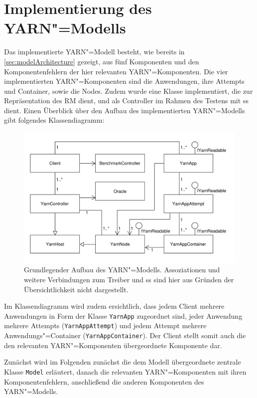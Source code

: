 \section{Implementierung des \acs{YARN}"=Modells}
\label{sec:yarnModel}

Das implementierte \ac{YARN}"=Modell besteht, wie bereits in \cref{sec:modelArchitecture} gezeigt, aus fünf Komponenten und den Komponentenfehlern der hier relevanten \ac{YARN}"=Komponenten.
Die vier implementierten \ac{YARN}"=Komponenten sind die Anwendungen, ihre Attempts und Container, sowie die Nodes.
Zudem wurde eine Klasse implementiert, die zur Repräsentation des \ac{RM} dient, und als Controller im Rahmen des Testens mit \ac{ss} dient.
Einen Überblick über den Aufbau des implementierten \ac{YARN}"=Modells gibt folgendes Klassendiagramm:

\begin{figure}[h]
    \includegraphics{./resources/yarnModel_ls_MA.pdf}
    \caption[Grundlegender Aufbau des \acs{YARN}"=Modells]
        {Grundlegender Aufbau des \acs{YARN}"=Modells.
        Assoziationen und weitere Verbindungen zum Treiber und \acs{ss} sind hier aus Gründen der Übersichtlichkeit nicht dargestellt.}
    \label{fig:yarnModelClassDiagram}
\end{figure}

Im Klassendiagramm wird zudem ersichtlich, dass jedem Client mehrere Anwendungen in Form der Klasse \texttt{YarnApp} zugeordnet sind, jeder Anwendung mehrere Attempts (\texttt{YarnAppAttempt}) und jedem Attempt mehrere Anwendungs"=Container (\texttt{YarnAppContainer}).
Der Client stellt somit auch die den relevanten \ac{YARN}"=Komponenten übergeordnete Komponente dar.

Zunächst wird im Folgenden zunächst die dem Modell übergeordnete zentrale Klasse \texttt{Model} erläutert, danach die relevanten \ac{YARN}"=Komponenten mit ihren Komponentenfehlern, anschließend die anderen Komponenten des \ac{YARN}"=Modells.

